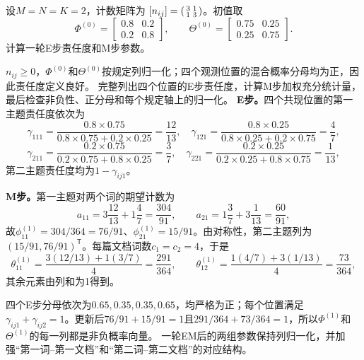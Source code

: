 \label{struct:V4-C06-CH32}
\begin{example}[一次完整E步与M步]\label{exm:V4-C06-one-em}
设$M=N=K=2$，计数矩阵为
$[n_{ij}]=\begin{psmallmatrix}3&1\\1&3\end{psmallmatrix}$。初值取
\[
\Phi^{(0)}=\begin{bmatrix}0.8&0.2\\0.2&0.8\end{bmatrix},\qquad
\Theta^{(0)}=\begin{bmatrix}0.75&0.25\\0.25&0.75\end{bmatrix}.
\]
计算一轮E步责任度和M步参数。

\label{struct:V4-C06-CH33}
\end{example}
\begin{solution}
\SolGiven $n_{ij}\ge0$，$\Phi^{(0)}$和$\Theta^{(0)}$按规定列归一化；四个观测位置的混合概率分母均为正，因此责任度定义良好。
\SolPlan 完整列出四个位置的E步责任度，计算M步加权充分统计量，最后检查非负性、正分母和每个规定轴上的归一化。
\SolDerive
\textbf{E步。}四个共现位置的第一主题责任度依次为
\[
\gamma_{111}=\frac{0.8\times0.75}{0.8\times0.75+0.2\times0.25}=\frac{12}{13},
\quad
\gamma_{121}=\frac{0.8\times0.25}{0.8\times0.25+0.2\times0.75}=\frac47,
\]
\[
\gamma_{211}=\frac{0.2\times0.75}{0.2\times0.75+0.8\times0.25}=\frac37,
\quad
\gamma_{221}=\frac{0.2\times0.25}{0.2\times0.25+0.8\times0.75}=\frac1{13},
\]
第二主题责任度均为$1-\gamma_{ij1}$。

\textbf{M步。}第一主题对两个词的期望计数为
\[
a_{11}=3\frac{12}{13}+1\frac47=\frac{304}{91},\qquad
a_{21}=1\frac37+3\frac1{13}=\frac{60}{91},
\]
故$\phi_{11}^{(1)}=304/364=76/91$、$\phi_{21}^{(1)}=15/91$。由对称性，第二主题列为$(15/91,76/91)^{\mathsf T}$。每篇文档词数$c_1=c_2=4$，于是
\[
\theta_{11}^{(1)}=\frac{3(12/13)+1(3/7)}4=\frac{291}{364},
\qquad
\theta_{12}^{(1)}=\frac{1(4/7)+3(1/13)}4=\frac{73}{364},
\]
其余元素由列和为1得到。

\SolCheck 四个E步分母依次为$0.65,0.35,0.35,0.65$，均严格为正；每个位置满足$\gamma_{ij1}+\gamma_{ij2}=1$。更新后$76/91+15/91=1$且$291/364+73/364=1$，所以$\Phi^{(1)}$和$\Theta^{(1)}$的每一列都是非负概率向量。
\SolAnswer 一轮EM后的两组参数保持列归一化，并加强“第一词--第一文档”和“第二词--第二文档”的对应结构。
\end{solution}

